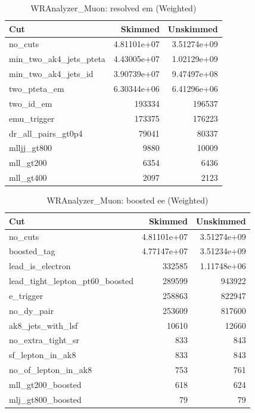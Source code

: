 \documentclass{article}
\begin{document}
\begin{table}[htbp]
\centering
\caption{WRAnalyzer\_Muon: resolved em (Weighted)}
\begin{tabular}{lrr}
\hline
Cut & Skimmed & Unskimmed \\
\hline
no\_cuts & 4.81101e+07 & 3.51274e+09 \\
min\_two\_ak4\_jets\_pteta & 4.43005e+07 & 1.02129e+09 \\
min\_two\_ak4\_jets\_id & 3.90739e+07 & 9.47497e+08 \\
two\_pteta\_em & 6.30344e+06 & 6.41296e+06 \\
two\_id\_em & 193334 & 196537 \\
emu\_trigger & 173375 & 176223 \\
dr\_all\_pairs\_gt0p4 & 79041 & 80337 \\
mlljj\_gt800 & 9880 & 10009 \\
mll\_gt200 & 6354 & 6436 \\
mll\_gt400 & 2097 & 2123 \\
\hline
\end{tabular}
\end{table}

\begin{table}[htbp]
\centering
\caption{WRAnalyzer\_Muon: boosted ee (Weighted)}
\begin{tabular}{lrr}
\hline
Cut & Skimmed & Unskimmed \\
\hline
no\_cuts & 4.81101e+07 & 3.51274e+09 \\
boosted\_tag & 4.77147e+07 & 3.51234e+09 \\
lead\_is\_electron & 332585 & 1.11748e+06 \\
lead\_tight\_lepton\_pt60\_boosted & 289599 & 943922 \\
e\_trigger & 258863 & 822947 \\
no\_dy\_pair & 253609 & 817600 \\
ak8\_jets\_with\_lsf & 10610 & 12660 \\
no\_extra\_tight\_sr & 833 & 843 \\
sf\_lepton\_in\_ak8 & 833 & 843 \\
no\_of\_lepton\_in\_ak8 & 753 & 761 \\
mll\_gt200\_boosted & 618 & 624 \\
mlj\_gt800\_boosted & 79 & 79 \\
\hline
\end{tabular}
\end{table}
\end{document}
